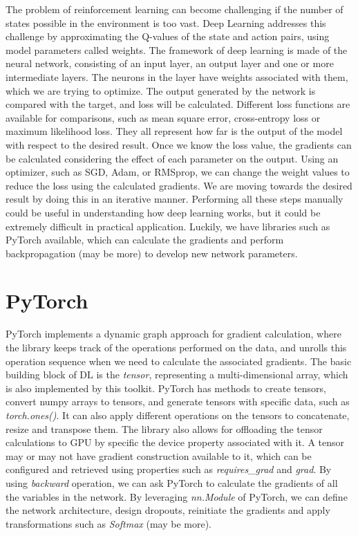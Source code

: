 \documentclass[logo,msc]{infthesis}           %
\begin{document}
The problem of reinforcement learning can become challenging if the number of states possible in the environment is too vast. Deep Learning addresses this challenge by approximating the Q-values of the state and action pairs, using model parameters called weights. The framework of deep learning is made of the neural network, consisting of an input layer, an output layer and one or more intermediate layers. The neurons in the layer have weights associated with 
them, which we are trying to optimize. The output generated by the network is compared with the target, and loss will be calculated. Different loss functions are available for comparisons, such as mean square error, cross-entropy loss or maximum likelihood loss. They all represent how far is the output of the model with respect to the desired result. Once we know the loss value, the gradients can be calculated considering the effect of each parameter on the output. Using an optimizer, such as SGD, Adam, or RMSprop, we can change the weight values to reduce the loss using the calculated gradients. We are moving towards the desired result by doing this in an iterative manner. Performing all these steps manually could be useful in understanding how deep learning works, but it could be extremely difficult in practical application. Luckily, we have libraries such as PyTorch available, which can calculate the gradients and perform backpropagation (may be more) to develop new network parameters.

\section{PyTorch}

PyTorch implements a dynamic graph approach for gradient calculation, where the library keeps track of the operations performed on the data, and unrolls this operation sequence when we need to calculate the associated gradients. The basic building block of DL is the \textit{tensor}, representing a multi-dimensional array, which is also implemented by this toolkit. PyTorch has methods to create tensors, convert numpy arrays to tensors, and generate tensors with specific data, such as \textit{torch.ones()}. It can also apply different operations on the tensors to concatenate, resize and transpose them. The library also allows for offloading the tensor calculations to GPU by specific the \textit{}device property associated with it. A tensor may or may not have gradient construction available to it, which can be configured and retrieved using properties such as \textit{requires\_grad} and \textit{grad}. By using \textit{backward} operation, we can ask PyTorch to calculate the gradients of all the variables in the network. By leveraging \textit{nn.Module} of PyTorch, we can define the network architecture, design dropouts, reinitiate the gradients and apply transformations such as \textit{Softmax} (may be more).
\end{document}
